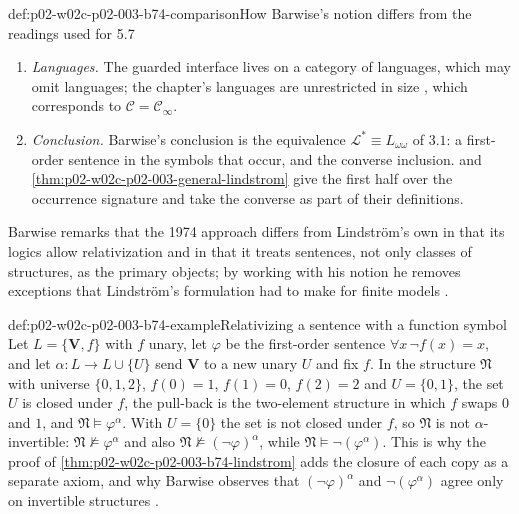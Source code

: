 \begin{hbwarning}{def:p02-w02c-p02-003-b74-comparison}{How Barwise's notion differs from the readings used for 5.7}
\begin{enumerate}
      it, and \cref{thm:p02-w02c-p02-003-b74-five-seven} keeps it as a
      hypothesis.
\item \emph{Languages.}  The guarded interface lives on a category of
      languages, which may omit languages; the chapter's languages are
      unrestricted in size \cite[ch.~A.1, \S3, p.~17]{Barwise1977FirstOrder},
      which corresponds to \(\mathcal C=\mathcal C_\infty\).
\item \emph{Conclusion.}  Barwise's conclusion is the equivalence
      \(\mathcal L^{\ast}\equiv L_{\omega\omega}\) of \(3.1\): a first-order
      sentence in the symbols that occur, and the converse inclusion.
       and
      \cref{thm:p02-w02c-p02-003-general-lindstrom} give the first half
      over the occurrence signature and take the converse as part of their
      definitions.
\end{enumerate}
Barwise remarks that the 1974 approach differs from Lindstr\"om's own in
that its logics allow relativization and in that it treats sentences, not
only classes of structures, as the primary objects; by working with his
notion he removes exceptions that Lindstr\"om's formulation had to make for
finite models \cite[Part~II, \S3, p.~259]{Barwise1974Axioms}.
\end{hbwarning}

\begin{hbexample}{def:p02-w02c-p02-003-b74-example}{Relativizing a sentence with a function symbol}
Let \(L=\{\mathbf V,f\}\) with \(f\) unary, let \(\varphi\) be the
first-order sentence \(\forall x\,\neg f(x)=x\), and let
\(\alpha:L\to L\cup\{U\}\) send \(\mathbf V\) to a new unary \(U\) and fix
\(f\).  In the structure \(\mathfrak N\) with universe
\(\{0,1,2\}\), \(f(0)=1\), \(f(1)=0\), \(f(2)=2\) and \(U=\{0,1\}\), the set
\(U\) is closed under \(f\), the pull-back is the two-element structure
in which \(f\) swaps \(0\) and \(1\), and \(\mathfrak N\models\varphi^{\alpha}\).
With \(U=\{0\}\) the set is not closed under \(f\), so \(\mathfrak N\) is not
\(\alpha\)-invertible: \(\mathfrak N\not\models\varphi^{\alpha}\) and also
\(\mathfrak N\not\models(\neg\varphi)^{\alpha}\), while
\(\mathfrak N\models\neg(\varphi^{\alpha})\).  This is why the proof of
\cref{thm:p02-w02c-p02-003-b74-lindstrom} adds the closure of each copy as a
separate axiom, and why Barwise observes that \((\neg\varphi)^{\alpha}\) and
\(\neg(\varphi^{\alpha})\) agree only on invertible structures
\cite[Part~I, \S9, after 9.11, pp.~243--244]{Barwise1974Axioms}.
\end{hbexample}

